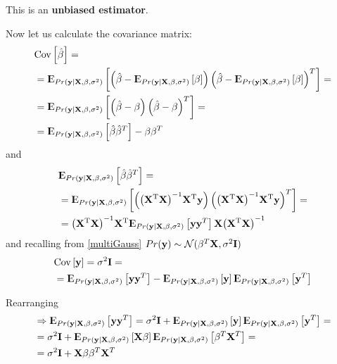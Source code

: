 This is an \textbf{unbiased estimator}.

Now let us calculate the covariance matrix:
\begin{equation}
\begin{aligned}
&\Cov \left[\hb \right] = \\
&=\E_{Pr(\y|\X,\beta, \sigma^2)}\left[ \left( \hb -\E_{Pr(\y|\X,\beta, \sigma^2)}\left[ \beta\right] \right) \left( \hb -\E_{Pr(\y|\X,\beta, \sigma^2)}\left[ \beta\right] \right)^T\right] = \\
&=\E_{Pr(\y|\X,\beta, \sigma^2)}\left[ \left( \hb - \beta \right) \left( \hb - \beta \right)^T\right] =\\
&=\E_{Pr(\y|\X,\beta, \sigma^2)}\left[ \hb\hb^T\right] -\beta\beta^T\end{aligned}
\end{equation}
and
\begin{equation}
\begin{aligned}
&\E_{Pr(\y|\X,\beta, \sigma^2)}\left[ \hb\hb^T\right] = \\
&=\E_{Pr(\y|\X,\beta, \sigma^2)} \left[ \left( \HM \y\right)\left( \HM \y\right)^T\right] = \\
& = \HM\E_{Pr(\y|\X,\beta, \sigma^2)} \left[   \y  \y^T\right] \X \inv
\end{aligned}
\end{equation}
and recalling from \autoref{multiGauss} $Pr(\y) \sim \CMcal{N}(\beta^T \X ,\sigma^2 \mathbf{I})$
\begin{equation}
\begin{aligned}
&\Cov\left[ \y\right]=\sigma^2 \mathbf{I} =\\
&=\E_{Pr(\y|\X,\beta, \sigma^2)}\left[ \y\y^T\right]  - \E_{Pr(\y|\X,\beta, \sigma^2)}\left[ \y\right]\E_{Pr(\y|\X,\beta, \sigma^2)}\left[ \y^T\right]\\
\end{aligned}
\end{equation}

Rearranging
\begin{equation}
\begin{aligned}
&\Rightarrow \E_{Pr(\y|\X,\beta, \sigma^2)}\left[ \y\y^T\right] = \sigma^2 \mathbf{I} +\E_{Pr(\y|\X,\beta, \sigma^2)}\left[ \y\right]\E_{Pr(\y|\X,\beta, \sigma^2)}\left[ \y^T\right] =\\
&=\sigma^2 \mathbf{I} +\E_{Pr(\y|\X,\beta, \sigma^2)}\left[ \X\beta\right]\E_{Pr(\y|\X,\beta, \sigma^2)}\left[ \beta^T\X^T\right] =\\
&= \sigma^2 \mathbf{I} +\X\beta \beta^T\X^T
\end{aligned}
\end{equation}

